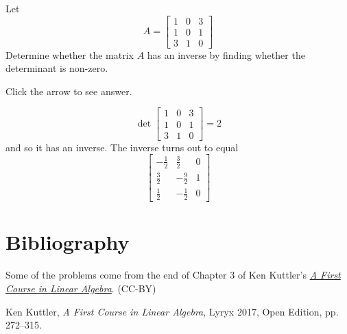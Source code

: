\documentclass{ximera}
\begin{document}
\begin{problem}\label{prb:7.30} Let
\begin{equation*}
A =
\left[
\begin{array}{rrr}
1 & 0 & 3 \\
1 & 0 & 1 \\
3 & 1 & 0
\end{array}
\right]
\end{equation*}
Determine whether the matrix $A$ has an inverse by finding whether the
determinant is non-zero. 

Click the arrow to see answer.
\begin{expandable}{}{}
\[
\det \left[
\begin{array}{rrr}
1 & 0 & 3 \\
1 & 0 & 1 \\
3 & 1 & 0
\end{array}
\right] = 2
\]
and so it has an inverse. The inverse turns out to equal
\[
\left[
\begin{array}{rrr}
-\frac{1}{2} & \frac{3}{2} & 0 \\
\frac{3}{2} & -\frac{9}{2} & 1 \\
\frac{1}{2} & -\frac{1}{2} & 0
\end{array}
\right]
\]
\end{expandable}
\end{problem}



\section*{Bibliography}
Some of the problems come from the end of Chapter 3 of Ken Kuttler's \href{https://open.umn.edu/opentextbooks/textbooks/a-first-course-in-linear-algebra-2017}{\it A First Course in Linear Algebra}. (CC-BY)

Ken Kuttler, {\it  A First Course in Linear Algebra}, Lyryx 2017, Open Edition, pp. 272--315.  
\end{document}
